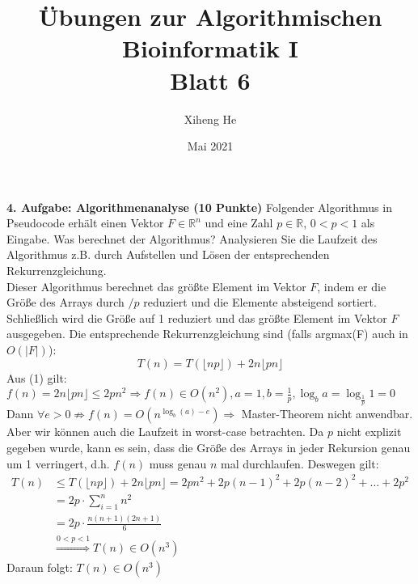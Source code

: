 \documentclass{article}
\title{Übungen zur Algorithmischen Bioinformatik I\\
Blatt 6}
\author{Xiheng He }
\date{Mai 2021}
\begin{document}
\maketitle
\begin{flushleft}
\textbf{4. Aufgabe: Algorithmenanalyse (10 Punkte)}
\newline
Folgender Algorithmus in Pseudocode erhält einen Vektor $F \in \mathbb{R}^n $ und eine Zahl $p \in \mathbb{R}$, $0 < p < 1$ als Eingabe.
\newline
Was berechnet der Algorithmus? Analysieren Sie die Laufzeit des Algorithmus z.B. durch Aufstellen
und Lösen der entsprechenden Rekurrenzgleichung.
\newline \\
Dieser Algorithmus berechnet das größte Element im Vektor $F$, indem er die Größe des Arrays durch $/p$ reduziert und die 
Elemente absteigend sortiert. Schließlich wird die Größe auf 1 reduziert und das größte Element im Vektor $F$ ausgegeben.
\newline
Die entsprechende Rekurrenzgleichung sind (falls argmax(F) auch in $O(|F|)$):
\begin{equation}
    T(n) = T(\lfloor np \rfloor) + 2n \lfloor pn \rfloor 
\end{equation}
Aus (1) gilt: $f(n) = 2n \lfloor pn \rfloor \leq 2pn^2 \Longrightarrow f(n) \in O(n^2), 
a = 1, b = \frac{1}{p}, \log_b a = \log_{\frac{1}{p}} 1 = 0$ \\
Dann $\forall e > 0 \not \Longrightarrow f(n) = O(n^{\log_b(a) - e}) \Longrightarrow$ Master-Theorem nicht anwendbar. \\
Aber wir können auch die Laufzeit in worst-case betrachten. Da $p$ nicht explizit gegeben wurde, kann es sein, dass die 
Größe des Arrays in jeder Rekursion genau um 1 verringert, d.h. $f(n)$ muss genau $n$ mal durchlaufen.
Deswegen gilt:
\begin{equation*}
    \begin{aligned}
        T(n) & \leq T(\lfloor np \rfloor) + 2n \lfloor pn \rfloor = 2pn^2 + 2p(n-1)^2 + 2p(n-2)^2 + \dots + 2p^2 \\
        &= 2p \cdot \sum_{i=1}^n n^2 \\
        &= 2p \cdot \frac{n(n+1)(2n+1)}{6} \\
        &\overset{0<p<1}{\Longrightarrow} T(n) \in O(n^3)
    \end{aligned} 
\end{equation*}
Daraun folgt: $T(n) \in O(n^3)$
\end{flushleft}
\end{document}
